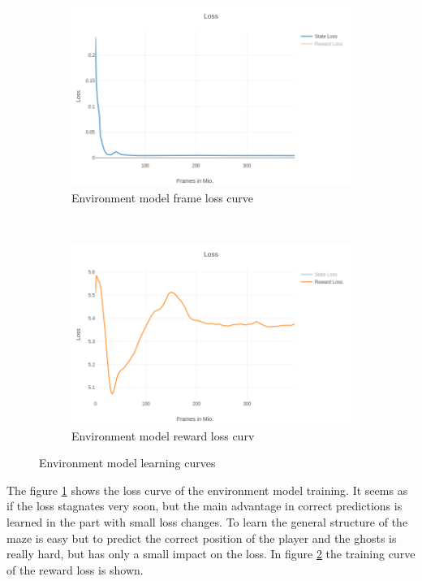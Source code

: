\begin{figure}[H] 
    \centering
    \begin{subfigure}[b]{0.45\textwidth}
        \includegraphics[width=\textwidth]{./Images/hunt_environment_model_loss.png}
  		\caption{Environment model frame loss curve} 
  		\label{fig:env_model_loss} 
    \end{subfigure}
	~ %
    \begin{subfigure}[b]{0.45\textwidth}
        \includegraphics[width=\textwidth]{./Images/hunt_environment_model_loss_reward.png}
  		\caption{Environment model reward loss curv} 
  		\label{fig:env_model_loss_reward}
    \end{subfigure}    
    \caption{Environment model learning curves}\label{fig:env_model_losses}
\end{figure}

The figure \ref{fig:env_model_loss} shows the loss curve of the environment model training. It seems as if the loss stagnates very soon, but the main advantage in correct predictions is learned in the part with small loss changes. To learn the general structure of the maze is easy but to predict the correct position of the player and the ghosts is really hard, but has only a small impact on the loss. In figure \ref{fig:env_model_loss_reward} the training curve of the reward loss is shown.\\




